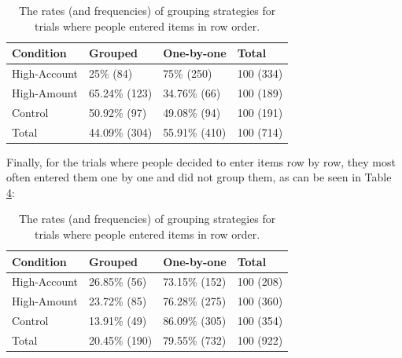 \begin{table}
\begin{enumerate}
 
\begin{table}[]
\centering
\begin{tabular}{|l|l|l|l|}
\hline
Condition    & Grouped       & One-by-one    & Total     \\ \hline
High-Account & 25\% {\footnotesize (84)}     & 75\% {\footnotesize (250)}    & 100 {\footnotesize (334)} \\ \hline
High-Amount  & 65.24\% {\footnotesize (123)} & 34.76\% {\footnotesize (66)}  & 100 {\footnotesize (189)} \\ \hline
Control      & 50.92\% {\footnotesize (97)}  & 49.08\% {\footnotesize (94)}  & 100 {\footnotesize (191)} \\ \hline
Total        & 44.09\% {\footnotesize (304)} & 55.91\% {\footnotesize (410)} & 100 {\footnotesize (714)} \\ \hline
\end{tabular}
\caption{The rates (and frequencies) of grouping strategies for trials where people entered items in column order.}\label{table:ch34_group-column}
\end{table}

Finally, for the trials where people decided to enter items row by row, they most often entered them one by one and did not group them, as can be seen in Table \ref{table:ch34_group-row}:
\begin{table}[]
\centering
\begin{tabular}{|l|l|l|l|}
\hline
Condition    & Grouped       & One-by-one    & Total     \\ \hline
High-Account & 26.85\% {\footnotesize (56)}  & 73.15\% {\footnotesize (152)} & 100 {\footnotesize (208)} \\ \hline
High-Amount  & 23.72\% {\footnotesize (85)}  & 76.28\% {\footnotesize (275)} & 100 {\footnotesize (360)} \\ \hline
Control      & 13.91\% {\footnotesize (49)}  & 86.09\% {\footnotesize (305)} & 100 {\footnotesize (354)} \\ \hline
Total        & 20.45\% {\footnotesize (190)} & 79.55\% {\footnotesize (732)} & 100 {\footnotesize (922)} \\ \hline
\end{tabular}
\caption{The rates (and frequencies) of grouping strategies for trials where people entered items in row order.}\label{table:ch34_group-row}
\end{table}


\end{enumerate}
\end{table}
